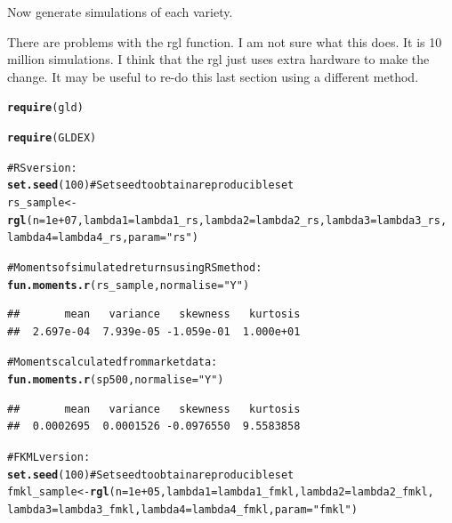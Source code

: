 \documentclass[12pt, a4paper, oneside]{article}\usepackage{graphicx, color}
\makeatletter
\newcommand{\hlfunctioncall}[1]{\textcolor[rgb]{0.501960784313725,0,0.329411764705882}{\textbf{#1}}}%
\newcommand{\hlstring}[1]{\textcolor[rgb]{0.6,0.6,1}{#1}}%
\newcommand{\hlcomment}[1]{\textcolor[rgb]{0.180392156862745,0.6,0.341176470588235}{#1}}%
\newenvironment{kframe}{%
 \def\at@end@of@kframe{}%
 \ifinner\ifhmode%
  \def\at@end@of@kframe{\end{minipage}}%
  \begin{minipage}{\columnwidth}%
 \fi\fi%
 \def\FrameCommand##1{\hskip\@totalleftmargin \hskip-\fboxsep
 \colorbox{shadecolor}{##1}\hskip-\fboxsep
     \hskip-\linewidth \hskip-\@totalleftmargin \hskip\columnwidth}%
 \MakeFramed {\advance\hsize-\width
   \@totalleftmargin\z@ \linewidth\hsize
   \@setminipage}}%
 {\par\unskip\endMakeFramed%
 \at@end@of@kframe}
\newenvironment{knitrout}{}{} %
\makeatother
\begin{document}
Now generate simulations of each variety. 

There are problems with the rgl function.  I am not sure what this does.  It is 10 million simulations.  I think that the rgl just uses extra hardware to make the change. It may be useful to re-do this last section using a different method. 
\begin{knitrout}
\color{fgcolor}\begin{kframe}
\begin{alltt}
\hlfunctioncall{require}(gld)
\end{alltt}


{\ttfamily\noindent\itshape\color{messagecolor}{\#\# Loading required package: gld}}\begin{alltt}
\hlfunctioncall{require}(GLDEX)
\end{alltt}


{\ttfamily\noindent\itshape\color{messagecolor}{\#\# Loading required package: GLDEX}}

{\ttfamily\noindent\itshape\color{messagecolor}{\#\# Loading required package: cluster}}\begin{alltt}
\hlcomment{# RS version:}
\hlfunctioncall{set.seed}(100)  \hlcomment{# Set seed to obtain a reproducible set}
rs_sample <- \hlfunctioncall{rgl}(n = 1e+07, lambda1 = lambda1_rs, lambda2 = lambda2_rs, lambda3 = lambda3_rs, 
    lambda4 = lambda4_rs, param = \hlstring{"rs"})

\hlcomment{# Moments of simulated returns using RS method:}
\hlfunctioncall{fun.moments.r}(rs_sample, normalise = \hlstring{"Y"})
\end{alltt}
\begin{verbatim}
##       mean   variance   skewness   kurtosis 
##  2.697e-04  7.939e-05 -1.059e-01  1.000e+01
\end{verbatim}
\begin{alltt}

\hlcomment{# Moments calculated from market data:}
\hlfunctioncall{fun.moments.r}(sp500, normalise = \hlstring{"Y"})
\end{alltt}
\begin{verbatim}
##       mean   variance   skewness   kurtosis 
##  0.0002695  0.0001526 -0.0976550  9.5583858
\end{verbatim}
\begin{alltt}

\hlcomment{# FKML version:}
\hlfunctioncall{set.seed}(100)  \hlcomment{# Set seed to obtain a reproducible set}
fmkl_sample <- \hlfunctioncall{rgl}(n = 1e+05, lambda1 = lambda1_fmkl, lambda2 = lambda2_fmkl, 
    lambda3 = lambda3_fmkl, lambda4 = lambda4_fmkl, param = \hlstring{"fmkl"})


\end{alltt}
\end{kframe}
\end{knitrout}
\end{document}
